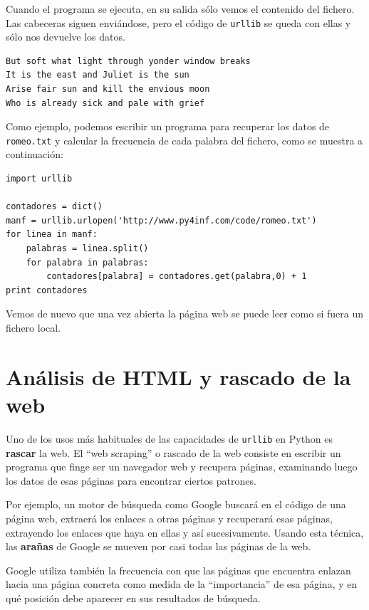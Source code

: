 Cuando el programa se ejecuta, en su salida
sólo vemos el contenido del fichero. Las cabeceras
siguen enviándose, pero el código de {\tt urllib}
se queda con ellas y sólo nos devuelve
los datos.

\beforeverb
\begin{verbatim}
But soft what light through yonder window breaks
It is the east and Juliet is the sun
Arise fair sun and kill the envious moon
Who is already sick and pale with grief
\end{verbatim}
\afterverb
%

Como ejemplo, podemos escribir un
programa para recuperar los datos de
{\tt romeo.txt} y calcular la frecuencia
de cada palabra del fichero, como se muestra a continuación:

\beforeverb
\begin{verbatim}
import urllib

contadores = dict()
manf = urllib.urlopen('http://www.py4inf.com/code/romeo.txt')
for linea in manf:
    palabras = linea.split()
    for palabra in palabras:
        contadores[palabra] = contadores.get(palabra,0) + 1   
print contadores
\end{verbatim}
\afterverb
%
Vemos de nuevo que una vez abierta la página web
se puede leer como si fuera un fichero local.

\section{Análisis de HTML y rascado de la web}

Uno de los usos más habituales de las capacidades de {\tt urllib} en Python
es {\bf rascar} la web. El ``web scraping'' o rascado de la web consiste en escribir un programa
que finge ser un navegador web y recupera páginas, examinando
luego los datos de esas páginas para encontrar ciertos patrones.

Por ejemplo, un motor de búsqueda como Google buscará en el código
de una página web, extraerá los enlaces a otras páginas y recuperará
esas páginas, extrayendo los enlaces que haya en ellas y así sucesivamente. Usando esta técnica,
las  {\bf arañas} de Google se mueven por casi todas las páginas de
la web.

Google utiliza también la frecuencia con que las páginas que encuentra enlazan
hacia una página concreta como medida de la ``importancia'' de
esa página, y en qué posición debe aparecer en sus resultados de búsqueda.

